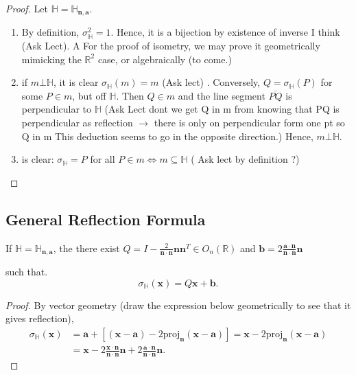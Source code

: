  \begin{proof}
   Let \( \mathbb{H} = \mathbb{H}_{\mathbf{n}, \mathbf{a}} \).

   \begin{enumerate}
     \item By definition, \( \sigma^{2}_{\mathbb{H}} = 1 \). Hence, it is a bijection by existence of inverse I think (Ask Lect). A  
      For the proof of isometry, we may prove it geometrically mimicking the \( \mathbb{R}^{2} \) case, or
        algebraically (to come.)
      \item if \( m \bot \mathbb{H} \), it is clear \( \sigma_{\mathbb{H}}\left( m  \right) = m \) (Ask lect) .
        Conversely, \( Q = \sigma_{\mathbb{H}}\left(P  \right) \) for some
        \( P \in m \), but off \( \mathbb{H} \). Then \( Q \in m \) and the line segment 
        \( \overline{PQ} \) is perpendicular to \( \mathbb{H} \)
        (Ask Lect dont we get Q in m from knowing that PQ is perpendicular as reflection \( \to \) there is only on perpendicular form one pt so Q in m
         This deduction seems to go in the opposite direction.)
        Hence, \( m \bot \mathbb{H} \).
      \item is clear: \( \sigma_{\mathbb{H}}= P  \) for all \( P \in m \iff m \subseteq \mathbb{H} \) ( Ask lect by definition ?)
   \end{enumerate}
  
 \end{proof}

 \subsection{General Reflection Formula}
\begin{theorem}
  If \( \mathbb{H} = \mathbb{H}_{\mathbf{n}, \mathbf{a}} \), the there exist \( Q = I - \frac{2}{\mathbf{n} \cdot \mathbf{n}} \mathbf{n} \mathbf{n}^{T} \in O_{n}\left(\mathbb{R}  \right)  \) and \( \mathbf{b} = 2 \frac{\mathbf{a} \cdot \mathbf{n}}{ \mathbf{n} \cdot \mathbf{n}}  \mathbf{n} \)

  such that.
  \[
    \sigma_{\mathbb{H}}\left(\mathbf{x}  \right) = Q \mathbf{x} + \mathbf{b}
  .\] 
\end{theorem}

\begin{proof}
 By vector geometry (draw the expression below geometrically to see that it gives reflection),
 \begin{align}
   \sigma_{\mathbb{H}} \left(\mathbf{x}\right) &= \mathbf{a} + \left[  \left( \mathbf{x} - \mathbf{a} \right) - 2 \text{proj}_{\mathbf{n}} \left( \mathbf{x} - \mathbf{a} \right)\right] = \mathbf{x} - 2 \text{proj}_{\mathbf{n}} \left( \mathbf{x} - \mathbf{a} \right) \\
                       &= \mathbf{x} - 2 \frac{\mathbf{x} \cdot \mathbf{n}}{ \mathbf{n} \cdot \mathbf{n}} \mathbf{n} + 2 \frac{\mathbf{a} \cdot \mathbf{n}}{\mathbf{n} \cdot \mathbf{n}} \mathbf{n}
 .\end{align}
\end{proof}

